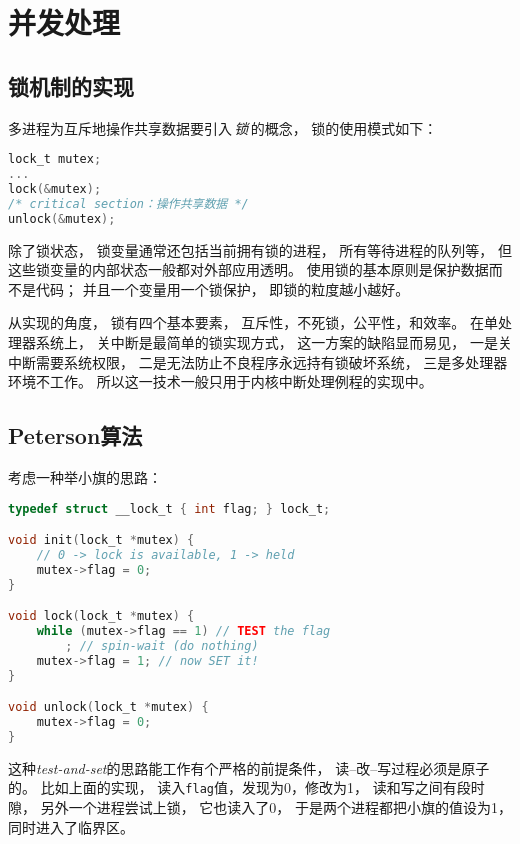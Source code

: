 \section{并发处理}
\subsection{锁机制的实现}
多进程为互斥地操作共享数据要引入\,{\em 锁}\,的概念，
锁的使用模式如下：
\begin{lstlisting}[language=C]
lock_t mutex;
...
lock(&mutex);
/* critical section：操作共享数据 */
unlock(&mutex);
  \end{lstlisting}
除了锁状态，
锁变量通常还包括当前拥有锁的进程，
所有等待进程的队列等，
但这些锁变量的内部状态一般都对外部应用透明。
使用锁的基本原则是保护数据而不是代码；
并且一个变量用一个锁保护，
即锁的粒度越小越好。

从实现的角度，
锁有四个基本要素，
互斥性，不死锁，公平性，和效率。
在单处理器系统上，
关中断是最简单的锁实现方式，
这一方案的缺陷显而易见，
一是关中断需要系统权限，
二是无法防止不良程序永远持有锁破坏系统，
三是多处理器环境不工作。
所以这一技术一般只用于内核中断处理例程的实现中。

\subsection{Peterson算法}
考虑一种举小旗的思路：
\begin{lstlisting}[language=C]
typedef struct __lock_t { int flag; } lock_t;

void init(lock_t *mutex) {
	// 0 -> lock is available, 1 -> held
	mutex->flag = 0;
}

void lock(lock_t *mutex) {
	while (mutex->flag == 1) // TEST the flag
		; // spin-wait (do nothing)
	mutex->flag = 1; // now SET it!
}

void unlock(lock_t *mutex) {
	mutex->flag = 0;
}
  \end{lstlisting}
这种{\em test-and-set}的思路能工作有个严格的前提条件，
读--改--写过程必须是原子的。
比如上面的实现，
读入\verb|flag|值，发现为0，修改为1，
读和写之间有段时隙，
另外一个进程尝试上锁，
它也读入了0，
于是两个进程都把小旗的值设为1，
同时进入了临界区。

